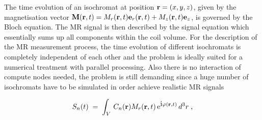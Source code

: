 \documentclass[journal,onecolumn,12pt]{IEEEtran}
\begin{document}
The time evolution of an isochromat at position ${\bf r}=(x,y,z)$, given by the magnetisation vector ${\bf M}({\bf
  r},t)=M_r({\bf r},t){\bf e}_r({\bf r},t) + M_z({\bf r},t){\bf e}_z$, is governed by the Bloch equation. The MR signal
is then described by the signal equation which essentially sums up all components within the coil volume. For the
description of the MR measurement process, the time evolution of different isochromats is completely independent of each
other and the problem is ideally suited for a numerical treatment with parallel processing. Also there is no interaction
of compute nodes needed, the problem is still demanding since a huge number of isochromats have to be simulated in order
achieve realistic MR signals

\begin{equation}\label{eq:signal}
	S_n(t)\;=\;\int_{V}\,C_n({\bf r}) M_r({\bf r},t)\,\mbox{e}^{\mbox{i}\varphi({\bf r},t)}\,d^3r \;,
\end{equation}
\end{document}

